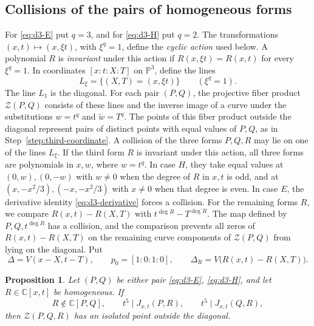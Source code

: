 \documentclass[11pt,letterpaper]{article}
\numberwithin{equation}{section}
\newtheorem{proposition}[proposition]{Proposition}
\theoremstyle{remark}
\theoremstyle{plain}
\newcommand{\C}{\mathbb{C}}
\begin{document}
\subsection{Collisions of the pairs of homogeneous forms}

For \eqref{eq:d3-E} put $q=3$, and for \eqref{eq:d3-H} put $q=2$.
The transformations $(x,t)\mapsto(x,\xi t)$, with $\xi^q=1$,
define the \emph{cyclic action} used below.
A polynomial $R$ is \emph{invariant} under this action if
$R(x,\xi t)=R(x,t)$ for every $\xi^q=1$.
In coordinates $[x:t:X:T]$ on $\mathbb P^3$, define the lines
\[
 L_\xi=\{(X,T)=(x,\xi t)\}\qquad(\xi^q=1).
\]
The line $L_1$ is the diagonal.
For each pair $(P,Q)$, the projective fiber product $\mathcal Z(P,Q)$
consists of these lines and the inverse image of a curve under the
substitutions $w=t^q$ and $\widetilde w=T^q$.
The points of this fiber product outside the diagonal represent
pairs of distinct points with equal values of $P,Q$, as in
Step~\ref{step:third-coordinate}.
A collision of the three forms $P,Q,R$ may lie on one of the lines $L_\xi$.
If the third form $R$ is invariant under this action, all three forms
are polynomials in $x,w$, where $w=t^q$.
In case $H$, they take equal values at $(0,w),(0,-w)$ with $w\neq0$
when the degree of $R$ in $x,t$ is odd, and at
$(x,-x^2/3),(-x,-x^2/3)$ with $x\neq0$ when that degree is even.
In case $E$, the derivative
identity \eqref{eq:d3-derivative} forces a collision.
For the remaining forms $R$, we compare $R(x,t)-R(X,T)$
with $t^{\deg R}-T^{\deg R}$.
The map defined by $P,Q,t^{\deg R}$ has a collision, and the
comparison prevents all zeros of $R(x,t)-R(X,T)$ on the remaining
curve components of $\mathcal Z(P,Q)$ from lying on the diagonal.  Put
\[
 \Delta=V(x-X,t-T),\qquad p_0=[1:0:1:0],\qquad
 \Delta_R=V\bigl(R(x,t)-R(X,T)\bigr).
\]

\begin{proposition}
\label{prop:d3-cubic-collision}
Let $(P,Q)$ be either pair \eqref{eq:d3-E}, \eqref{eq:d3-H}, and let
$R\in\C[x,t]$ be homogeneous.  If
\begin{equation}
 R\notin\C[P,Q],\qquad
 t^5\mid J_{x,t}(P,R),\qquad t^5\mid J_{x,t}(Q,R),  \label{eq:d3-ramification}
\end{equation}
then $\mathcal Z(P,Q,R)$ has an isolated point outside the diagonal.
\end{proposition}
\end{document}
